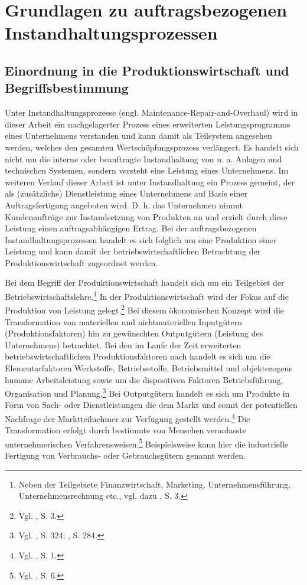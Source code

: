 \chapter{Grundlagen zu auftragsbezogenen Instandhaltungsprozessen}\label{Instandhaltung}
\setcounter{footnote}{4}  %

\section{Einordnung in die Produktionswirtschaft und Begriffsbestimmung}

Unter Instandhaltungsprozesse (engl. Maintenance-Repair-and-Overhaul) wird in dieser Arbeit ein nachgelagerter Prozess eines erweiterten Leistungsprogramms eines Unternehmens verstanden und kann damit als Teilsystem angesehen werden, welches den gesamten Wertschöpfungsprozess verlängert. Es handelt sich nicht um die interne oder beauftragte Instandhaltung von u. a. Anlagen und technischen Systemen, sondern versteht eine Leistung eines Unternehmens. Im weiteren Verlauf dieser Arbeit ist unter Instandhaltung ein Prozess gemeint, der als (zusätzliche) Dienstleistung eines Unternehmens auf Basis einer Auftragsfertigung angeboten wird. D. h. das Unternehmen nimmt Kundenaufträge zur Instandsetzung von Produkten an und erzielt durch diese Leistung einen auftragsabhängigen Ertrag. Bei der auftragsbezogenen Instandhaltungsprozessen handelt es sich folglich um eine Produktion einer Leistung und kann damit der betriebswirtschaftlichen Betrachtung der Produktionswirtschaft zugeordnet werden.

Bei dem Begriff der Produktionswirtschaft handelt sich um ein Teilgebiet der Betriebswirtschaftslehre.\footnote{Neben der Teilgebiete Finanzwirtschaft, Marketing, Unternehmensführung, Unternehmensrechnung etc., vgl. dazu \cite{Dyckhoff2010}, S. 3.} In der Produktionswirtschaft wird der Fokus auf die Produktion von Leistung gelegt.\footnote{Vgl. \cite{Dyckhoff2010}, S. 3.} Bei diesem ökonomischen Konzept wird die Transformation von materiellen und nichtmateriellen Inputgütern (Produktionsfaktoren) hin zu gewünschten Outputgütern (Leistung des Unternehmens) betrachtet. Bei den im Laufe der Zeit erweiterten betriebswirtschaftlichen Produktionsfaktoren nach \citet[S. 71]{Gutenberg:1959aa} handelt es sich um die Elementarfaktoren Werkstoffe, Betriebsstoffe, Betriebsmittel und objektezogene humane Arbeitsleistung sowie um die dispositiven Faktoren Betriebsführung, Organisation und Planung.\footnote{Vgl. \cite{Schubert:2005aa}, S. 324; \cite{Weber:1999aa}, S. 284.} Bei Outputgütern handelt es sich um Produkte in Form von Sach- oder Dienstleistungen die dem Markt und somit der potentiellen Nachfrage der Marktteilnehmer zur Verfügung gestellt werden.\footnote{Vgl. \cite{Schmidt:2012aa}, S. 1.} Die Transformation erfolgt durch bestimmte von Menschen veranlasste unternehmerischen Verfahrensweisen.\footnote{Vgl. \cite{tempelmeier1994produktion}, S. 6.} Beispielsweise kann hier die industrielle Fertigung von Verbrauchs- oder Gebrauchsgütern genannt werden.

